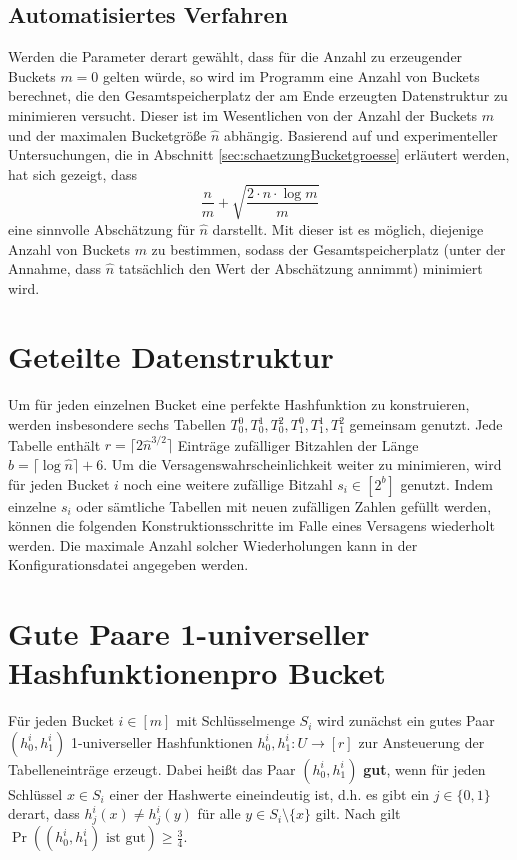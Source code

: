 \documentclass[a4paper,12pt,twoside]{report}
\begin{document}
\subsection{Automatisiertes Verfahren}
\label{sec:splitAutomatisiert}

Werden die Parameter derart gewählt, dass für die Anzahl zu erzeugender Buckets $m=0$ gelten würde, so wird im Programm eine Anzahl von Buckets berechnet, die den Gesamtspeicherplatz der am Ende erzeugten Datenstruktur zu minimieren versucht.
Dieser ist im Wesentlichen von der Anzahl der Buckets $m$ und der maximalen Bucketgröße $\hat{n}$ abhängig.
Basierend auf \cite[Theorem 1]{Raab1998} und experimenteller Untersuchungen, die in Abschnitt \ref{sec:schaetzungBucketgroesse} erläutert werden, hat sich gezeigt, dass \[\frac{n}{m}+\sqrt{\frac{2\cdot n\cdot\log m}{m}}\] eine sinnvolle Abschätzung für $\hat{n}$ darstellt.
Mit dieser ist es möglich, diejenige Anzahl von Buckets $m$ zu bestimmen, sodass der Gesamtspeicherplatz (unter der Annahme, dass $\hat{n}$ tatsächlich den Wert der Abschätzung annimmt) minimiert wird.

\section{Geteilte Datenstruktur}
\label{sec:geteilteDatenstruktur}

Um für jeden einzelnen Bucket eine perfekte Hashfunktion zu konstruieren, werden insbesondere sechs Tabellen $T_0^0, T_0^1, T_0^2, T_1^0, T_1^1, T_1^2$ gemeinsam genutzt.
Jede Tabelle enthält $r=\lceil 2 \hat{n}^{3/2}\rceil$ Einträge zufälliger Bitzahlen der Länge $b=\lceil\log\hat{n}\rceil+6$.
Um die Versagenswahrscheinlichkeit weiter zu minimieren, wird für jeden Bucket $i$ noch eine weitere zufällige Bitzahl $s_i\in[2^b]$ genutzt.
Indem einzelne $s_i$ oder sämtliche Tabellen mit neuen zufälligen Zahlen gefüllt werden, können die folgenden Konstruktionsschritte im Falle eines Versagens wiederholt werden. Die maximale Anzahl solcher Wiederholungen kann in der Konfigurationsdatei angegeben werden.

\section[Gute Paare 1-universeller Hashfunktionen pro Bucket]{Gute Paare 1-universeller Hashfunktionen\linebreak pro Bucket}
\label{sec:gutePaare}

Für jeden Bucket $i\in[m]$ mit Schlüsselmenge $S_i$ wird zunächst ein gutes Paar $(h_0^i, h_1^i)$ 1-universeller Hashfunktionen $h_0^i, h_1^i\colon U\to[r]$ zur Ansteuerung der Tabelleneinträge erzeugt.
Dabei heißt das Paar $(h_0^i, h_1^i)$ \textbf{gut}, wenn für jeden Schlüssel $x\in S_i$ einer der Hashwerte eineindeutig ist, d.h. es gibt ein $j\in\{0, 1\}$ derart, dass $h_j^i(x)\neq h_j^i(y)$ für alle $y\in S_i\setminus\{x\}$ gilt.
Nach \cite[Lemma 2]{Dietzfelbinger2007} gilt $\Pr\left((h_0^i, h_1^i)\text{ ist gut}\right)\ge\frac{3}{4}$.
\end{document}
